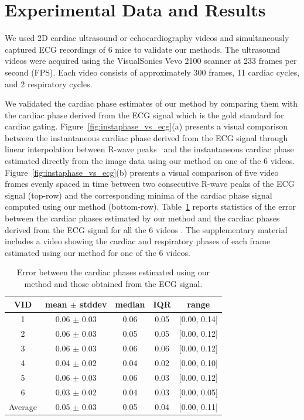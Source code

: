 \documentclass[journal]{IEEEtran}
\newcommand{\rk}[1]{{\color{blue}{#1}}}
\begin{document}
\section{Experimental Data and Results}
\label{sec:results}
%
We used 2D cardiac ultrasound or echocardiography videos and simultaneously captured ECG recordings of 6 mice to validate our methods. The ultrasound videos were acquired using the VisualSonics Vevo 2100 scanner at 233 frames per second (FPS). Each video consists of approximately 300 frames, 11 cardiac cycles, and 2 respiratory cycles.

We validated the cardiac phase estimates of our method by comparing them with the cardiac phase derived from the ECG signal which is the gold standard for cardiac gating. Figure~\ref{fig:instaphase_vs_ecg}(a) presents a visual comparison between the instantaneous cardiac phase derived from the ECG signal through linear interpolation between R-wave peaks~\cite{Rosenblum2001,Freund2003} and the instantaneous cardiac phase estimated directly from the image data using our method on one of the 6 videos. Figure~\ref{fig:instaphase_vs_ecg}(b) presents a visual comparison of five video frames evenly spaced in time between two consecutive R-wave peaks of the ECG signal (top-row) and the corresponding minima of the cardiac phase signal computed using our method (bottom-row). Table~\ref{table:phase_estimation_error} reports statistics of the error between the cardiac phases estimated by our method and the cardiac phases derived from the ECG signal for all the 6 videos \rk{where in the phases are in the normalized $[0, 1]$ range}. The supplementary material includes a video showing the cardiac and respiratory phases of each frame estimated using our method for one of the 6 videos.

%	
\begin{table}[h]
\begin{minipage}[t]{0.95\linewidth}
\centering
\caption{Error between the cardiac phases estimated using our method and those obtained from the ECG signal.}
\begin{tabular}{|c|c|c|c|c|}
\hline
VID & mean $\pm$ stddev & median & IQR & range \\ \hline
1 & 0.06 $\pm$ 0.03 & 0.06 & 0.05 & {[}0.00, 0.14{]} \\ \hline
2 & 0.06 $\pm$ 0.03 & 0.05 & 0.05 & {[}0.00, 0.12{]} \\ \hline
3 & 0.06 $\pm$ 0.03 & 0.06 & 0.06 & {[}0.00, 0.12{]} \\ \hline
4 & 0.04 $\pm$ 0.02 & 0.04 & 0.02 & {[}0.00, 0.10{]} \\ \hline
5 & 0.06 $\pm$ 0.03 & 0.06 & 0.03 & {[}0.00, 0.12{]} \\ \hline
6 & 0.03 $\pm$ 0.02 & 0.04 & 0.03 & {[}0.00, 0.05{]} \\ \hline \hline
Average & 0.05 $\pm$ 0.03 & 0.05 & 0.04 & {[}0.00, 0.11{]} \\ \hline
\end{tabular}
\label{table:phase_estimation_error}
\end{minipage}
\end{table}	
%	
	
\end{document}
